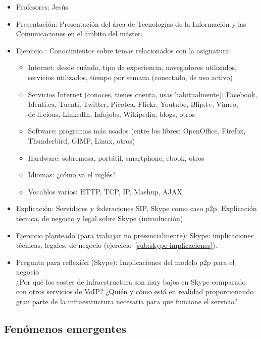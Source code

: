 \documentclass[a4paper,12pt]{article}
\begin{document}
\begin{itemize}
\item Profesores: Jesús
\item Presentación: Presentación del área de Tecnologías de la Información y las Comunicaciones en el ámbito del máster.
\item Ejercicio : Conocimientos sobre temas relacionados con la asignatura:
  \begin{itemize}
  \item Internet: desde cuándo, tipo de experiencia, navegadores utilizados, servicios utilizados, tiempo por semana (conectado, de uso activo)
  \item Servicios Internet (conoces, tienes cuenta, usas habitualmente): Facebook, Identi.ca, Tuenti, Twitter, Picotea, Flickr, Youtube, Blip.tv, Vimeo, de.li.cious, LinkedIn, Infojobs, Wikipedia, blogs, otros
  \item Software: programas más usados (entre los libres: OpenOffice, Firefox, Thunderbird, GIMP, Linux, otros)
  \item Hardware: sobremesa, portátil, smartphone, ebook, otros
  \item Idiomas: ¿cómo va el inglés?
  \item Vocablos varios: HTTP, TCP, IP, Mashup, AJAX
  \end{itemize}
\item Explicación: Servidores y federaciones SIP, Skype como caso p2p. Explicación técnica, de negocio y legal sobre Skype (introducción)
\item Ejercicio planteado (para trabajar no presencialmente): Skype: implicaciones técnicas, legales, de negocio (ejercicio~\ref{sub:skype-implicaciones}).
\item Pregunta para reflexión (Skype): Implicaciones del modelo p2p para el negocio \\
  ¿Por qué los costes de infraestructura son muy bajos en Skype comparado con otros servicios de VoIP? ¿Quién y cómo está en realidad proporcionando gran parte de la infraestructura necesaria para que funcione el servicio?
\end{itemize}

\subsection{Fenómenos emergentes}
\end{document}
